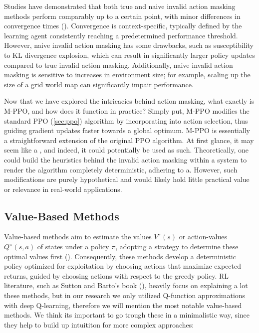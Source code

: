             \noindent Studies have demonstrated that both true and naive invalid action masking methods perform comparably up to a certain point, with minor differences in convergence times (\textcolor{deepblue}{\cite{Huang_2022}}). Convergence is context-specific, typically defined by the learning agent consistently reaching a predetermined performance threshold. However, naive invalid action masking has some drawbacks, such as susceptibility to KL divergence explosion, which can result in significantly larger policy updates compared to true invalid action masking. Additionally, naive invalid action masking is sensitive to increases in environment size; for example, scaling up the size of a grid world map can significantly impair performance.
            
            \bigskip
            
            \noindent Now that we have explored the intricacies behind action masking, what exactly is M-PPO, and how does it function in practice? Simply put, M-PPO modifies the standard PPO (\autoref{sec:ppo}) algorithm by incorporating  into action selection, thus guiding gradient updates faster towards a global optimum. M-PPO is essentially a straightforward extension of the original PPO algorithm. At first glance, it may seem like a , and indeed, it could potentially be used as such. Theoretically, one could build the heuristics behind the invalid action masking within a system to render the algorithm completely deterministic, adhering to a. However, such modifications are purely hypothetical and would likely hold little practical value or relevance in real-world applications.

    \subsection{Value-Based Methods}
    \label{subsec:value-based-methods}
        
        \noindent Value-based methods aim to estimate the values $V^{\pi}(s)$ or action-values $Q^{\pi}(s, a)$ of states under a policy $\pi$, adopting a strategy to determine these optimal values first (\textcolor{deepblue}{\cite{SpinningUp2018}}). Consequently, these methods develop a deterministic policy optimized for exploitation by choosing actions that maximize expected returns, guided by choosing actions with respect to the greedy policy. RL literature, such as Sutton and Barto's book (\cite{Sutton1998}), heavily focus on explaining a lot these methods, but in our research we only utilized Q-function approximations with deep Q-learning, therefore we will mention the most notable value-based methods. We think its important to go trough these in a minimalistic way, since they help to build up intuititon for more complex approaches:
        
